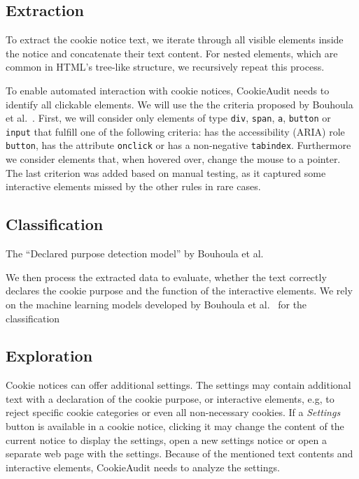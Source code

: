 \subsection{Extraction} \label{subsec:extraction}
To extract the cookie notice text, we iterate through all visible elements inside the notice and concatenate their text content.
For nested elements, which are common in HTML's tree-like structure, we recursively repeat this process.

To enable automated interaction with cookie notices, CookieAudit needs to identify all clickable elements.
We will use the the criteria proposed by Bouhoula et al.~\cite{bouhoula2023automated}.
First, we will consider only elements of type \verb|div|, \verb|span|, \verb|a|, \verb|button| or \verb|input| that fulfill one of the following criteria: 
has the accessibility (ARIA) role \verb|button|, 
has the attribute \verb|onclick| or
has a non-negative \verb|tabindex|.
Furthermore we consider elements that, when hovered over, change the mouse to a pointer.
The last criterion was added based on manual testing, as it captured some interactive elements missed by the other rules in rare cases.

\subsection{Classification}
\color{orange}
The \enquote{Declared purpose detection model} by Bouhoula et al.~\cite{bouhoula2023automated}

We then process the extracted data to evaluate, whether the text correctly declares the cookie purpose and the function of the interactive elements.
We rely on the machine learning models developed by Bouhoula et al.~\cite{bouhoula2023automated} for the classification
\color{black}

\subsection{Exploration}
Cookie notices can offer additional settings.
The settings may contain additional text with a declaration of the cookie purpose, or interactive elements, e.g, to reject specific cookie categories or even all non-necessary cookies.
If a \emph{Settings} button is available in a cookie notice, clicking it may change the content of the current notice to display the settings, open a new settings notice or open a separate web page with the settings.
Because of the mentioned text contents and interactive elements, CookieAudit needs to analyze the settings.

